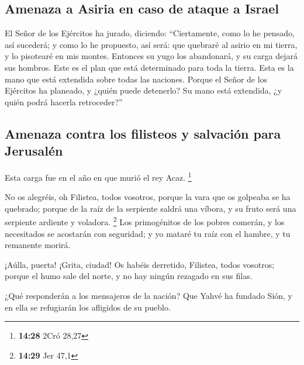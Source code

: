 \begin{paracol}{2}
\hypertarget{amenaza-a-asiria-en-caso-de-ataque-a-israel}{%
\subsection{Amenaza a Asiria en caso de ataque a
Israel}\label{amenaza-a-asiria-en-caso-de-ataque-a-israel}}

 El Señor de los Ejércitos ha jurado, diciendo:
``Ciertamente, como lo he pensado, así sucederá; y como lo he propuesto,
así será:  que quebraré al asirio en mi tierra, y lo
pisotearé en mis montes. Entonces su yugo los abandonará, y su carga
dejará sus hombros.  Este es el plan que está determinado
para toda la tierra. Esta es la mano que está extendida sobre todas las
naciones.  Porque el Señor de los Ejércitos ha planeado,
y ¿quién puede detenerlo? Su mano está extendida, ¿y quién podrá hacerla
retroceder?''

\hypertarget{amenaza-contra-los-filisteos-y-salvaciuxf3n-para-jerusaluxe9n}{%
\subsection{Amenaza contra los filisteos y salvación para
Jerusalén}\label{amenaza-contra-los-filisteos-y-salvaciuxf3n-para-jerusaluxe9n}}

 Esta carga fue en el año en que murió el rey Acaz.
\footnote{\textbf{14:28} 2Cró 28,27}

 No os alegréis, oh Filistea, todos vosotros, porque la
vara que os golpeaba se ha quebrado; porque de la raíz de la serpiente
saldrá una víbora, y su fruto será una serpiente ardiente y voladora.
\footnote{\textbf{14:29} Jer 47,1}  Los primogénitos de
los pobres comerán, y los necesitados se acostarán con seguridad; y yo
mataré tu raíz con el hambre, y tu remanente morirá.

 ¡Aúlla, puerta! ¡Grita, ciudad! Os habéis derretido,
Filistea, todos vosotros; porque el humo sale del norte, y no hay ningún
rezagado en sus filas.

 ¿Qué responderán a los mensajeros de la nación? Que
Yahvé ha fundado Sión, y en ella se refugiarán los afligidos de su
pueblo.

\switchcolumn
\begin{otherlanguage}{english}

\hypertarget{god-will-restore-his-people-israel-by-mercy-after-the-fall-of-babylon}{%
}
\end{otherlanguage}
\end{paracol}
